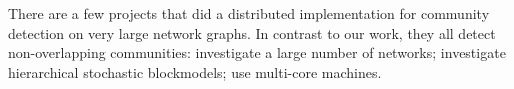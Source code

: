 \begin{comment}
Since our SG-MCMC algorithm is completely different from deep-learning
algorithms, it makes no real sense to compare to the learning frameworks
Theano, Caffe, cuDNN, or NVidia Digits, even though they target GPUs.

SG-MCMC work NOT on GPUs:

GPU work:
MCMC Hamiltonian:
	1. Andrew L. Beam, Sujit K. Ghosh, Jon Doyle
		Fast Hamiltonian Monte Carlo Using GPU Computing
		http://arxiv.org/pdf/1402.4089.pdf
MMSB tensor:

MCMC (not SG):
    1. Alan Medlar, Dorota Głowacka, Horia Stanescu, Kevin Bryson, Robert Kleta
       SwiftLink: Parallel MCMC linkage analysis utilising multicore CPU and GPU
       http://bioinformatics.oxfordjournals.org/content/early/2012/12/13/bioinformatics.bts704.full.pdf
    2. Marc Suchard, Chris Holmes, Mike West
       Some of the What?, Why?, How?, Who?  and Where?  of Graphics Processing Unit Computing for Bayesian Analysis
       https://stat.duke.edu/gpustatsci/GPU-ISBABull2010.pdf
\end{comment}

\begin{comment}
In this paper, we describe our custom RDMA D-KV (Distributed Key-Value)
store. Current RMDA D-KV store implementations are RamCloud~\cite{RamCloud},
Pilaf~\cite{Pilaf}, Herd~\cite{Herd} and FaRM~\cite{FaRM}. All these systems
use RDMA to implement a D-KV store. However, all of them are far more powerful
than our custom implementation -- and this power comes at a cost that we
can avoid. They implement a generic D-KV store that controls concurrency,
supports dynamic inserts and deletes, supports variable-sized values
(whose size may change at an update), and keys of arbitrary type. Because
of the nature of our distributed algorithm, we have to deal with none of
these issues. For us, values are fixed-size, allocated only at the initial
population, and remain alive forever. We have no concurrency between writes
and reads or other writes. Our keys are a contiguous range of integers. All
these properties together allow an extremely low-overhead implementation
that does not involve the remote host in any transaction.
\end{comment}

There are a few projects that did a distributed implementation
for community detection on very large network graphs. In contrast to our work,
they all detect non-overlapping communities: \cite{Bu2013246} investigate a
large number of networks; \cite{2015arXiv150302115L} investigate hierarchical
stochastic blockmodels; \cite{Prat-Perez:2014:HQS:2566486.2568010} use
multi-core machines.

